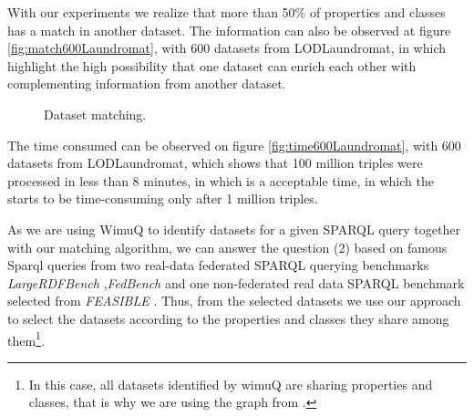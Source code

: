 With our experiments we realize that more than 50\% of properties and classes has a match in another dataset. The information can also be observed at figure \ref{fig:match600Laundromat}, with 600 datasets from LODLaundromat\cite{beek2014lod}, in which highlight the high possibility that one dataset can enrich each other with complementing information from another dataset.

\begin{figure}[ht!]
     \begin{center}
%
%
    \end{center}
   \label{fig:subfigures}
   \caption{Dataset matching.}
\end{figure}

The time consumed can be observed on figure \ref{fig:time600Laundromat}, with 600 datasets from LODLaundromat\cite{beek2014lod}, which shows that 100 million triples were processed in less than 8 minutes, in which is a acceptable time, in which the starts to be time-consuming only after 1 million triples.

As we are using WimuQ\cite{ValdestilhasKcap} to identify datasets for a given SPARQL query together with our matching algorithm, we can answer the question (2) based on famous Sparql queries from two real-data federated SPARQL querying benchmarks \emph{LargeRDFBench} \cite{largerdfbench2017},\emph{FedBench} \cite{fedbench2011} and one non-federated real data SPARQL benchmark selected from \emph{FEASIBLE} \cite{feasible2015}. Thus, from the selected datasets we use our approach to select the datasets according to the properties and classes they share among them\footnote{In this case, all datasets identified by wimuQ are sharing properties and classes, that is why we are using the graph from \cite{ValdestilhasKcap}.}.

